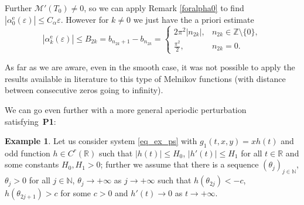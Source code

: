 \documentclass[10pt]{article}
\numberwithin{equation}{section}
\def\ep{\varepsilon}
\def\N{{\mathbb N}}
\def\Z{{\mathbb Z}}
\def\R{{\mathbb R}}
\def\ee{{\mathrm e}}
\def\MM{{\mathcal M}}
\def\aaa{\theta}
\newcommand\assump[1]{{\rm\textbf{#1}}}
\theoremstyle{definition}
\newtheorem{example}[theorem]{Example}
\theoremstyle{remark}
\begin{document}
 Further
$\MM'(T_0)\ne 0$, so  we can   apply  Remark \ref{foralpha0} to find $|\alpha_0^{\ee}(\ep)|\le C_{\alpha} \ep$.
 However for $k \ne 0$ we just have the a priori
 estimate
 \begin{equation}\label{aBk}
   |\alpha_k^{\ee}(\ep)|
 	\le B_{2k}= b_{n_{2k}+1}-b_{n_{2k}}
    =\begin{cases} 2\pi^2 |n_{2k}|,& n_{2k}\in\Z\setminus\{0\},\\ \frac{\pi^2}{2},& n_{2k}=0.\end{cases}
 \end{equation}


 As far as we are aware, even in the smooth case, it was not possible to apply
the results available in literature to this type of Melnikov functions (with distance between  consecutive  zeros going to infinity).


\medskip

We can go even further with a more general aperiodic perturbation satisfying~\assump{P1}:

\begin{example}\label{exgen2}
	Let us consider system \eqref{eq_ex_ps} with $g_1(t,x,y)=x h(t)$ and odd function  $h\in C^r(\R)$ such that $|h(t)|\leq H_0$,
$|h'(t)|\leq H_1$ for all $t\in\R$ and some constants $H_0,H_1>0$; further we assume that there is a  sequence $(\aaa_j)_{j \in
\N}$,  $\theta_j>0$ for all $j\in\N$, $\aaa_j \to + \infty$ as
$j \to + \infty$
such that $h(\aaa_{2j})<-c$, $h(\aaa_{2j+1})>c$ for some $c>0$  and  $h'(t) \to 0$ as $t \to +\infty$.
\end{example}
\end{document}
